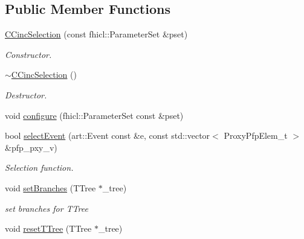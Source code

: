 \subsection*{Public Member Functions}
\begin{DoxyCompactItemize}
\item 
\hyperlink{classselection_1_1CCincSelection_ab8a0d1e95a3db00340396b7bb4075bb0}{C\+Cinc\+Selection} (const fhicl\+::\+Parameter\+Set \&pset)
\begin{DoxyCompactList}\small\item\em Constructor. \end{DoxyCompactList}\item 
\hyperlink{classselection_1_1CCincSelection_a190f4243314f765ca456179437ad6602}{$\sim$\+C\+Cinc\+Selection} ()\hypertarget{classselection_1_1CCincSelection_a190f4243314f765ca456179437ad6602}{}\label{classselection_1_1CCincSelection_a190f4243314f765ca456179437ad6602}

\begin{DoxyCompactList}\small\item\em Destructor. \end{DoxyCompactList}\item 
void \hyperlink{classselection_1_1CCincSelection_a6102d1ccc299153bc168c721028819e1}{configure} (fhicl\+::\+Parameter\+Set const \&pset)
\item 
bool \hyperlink{classselection_1_1CCincSelection_ae8555674551f611dee06dc315ac2987f}{select\+Event} (art\+::\+Event const \&e, const std\+::vector$<$ Proxy\+Pfp\+Elem\+\_\+t $>$ \&pfp\+\_\+pxy\+\_\+v)
\begin{DoxyCompactList}\small\item\em Selection function. \end{DoxyCompactList}\item 
void \hyperlink{classselection_1_1CCincSelection_a4ddb77bf23a3d37330aaaac9cbffdfa4}{set\+Branches} (T\+Tree $\ast$\+\_\+tree)\hypertarget{classselection_1_1CCincSelection_a4ddb77bf23a3d37330aaaac9cbffdfa4}{}\label{classselection_1_1CCincSelection_a4ddb77bf23a3d37330aaaac9cbffdfa4}

\begin{DoxyCompactList}\small\item\em set branches for T\+Tree \end{DoxyCompactList}\item 
void \hyperlink{classselection_1_1CCincSelection_adcc5ef83ec6e380db3af8ef55deff0a9}{reset\+T\+Tree} (T\+Tree $\ast$\+\_\+tree)\hypertarget{classselection_1_1CCincSelection_adcc5ef83ec6e380db3af8ef55deff0a9}{}\label{classselection_1_1CCincSelection_adcc5ef83ec6e380db3af8ef55deff0a9}


\end{DoxyCompactItemize}
